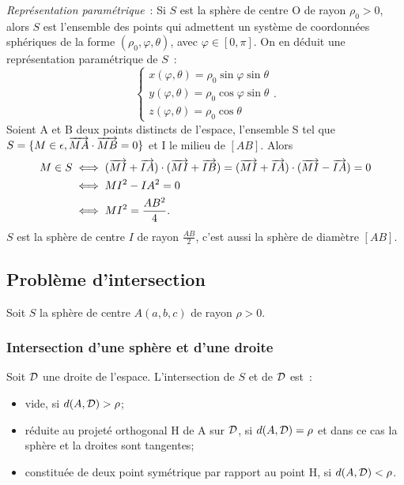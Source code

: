 \emph{Représentation paramétrique}~: Si \(S\) est la sphère de centre O de rayon \(\rho_0>0\), alors \(S\) est l'ensemble des points qui admettent un système de coordonnées sphériques de la forme \((\rho_0,\varphi,\theta)\), avec \(\varphi\in[0,\pi]\).
On en déduit une représentation paramétrique de \(S\)~:
\begin{equation}
  \begin{cases}
    x(\varphi,\theta)=\rho_0\sin\varphi\sin\theta\\
    y(\varphi,\theta)=\rho_0\cos\varphi\sin\theta\\
    z(\varphi,\theta)=\rho_0\cos\theta
  \end{cases}.
\end{equation}
Soient A et B deux points distincts de l'espace, l'ensemble S tel que \(S=\{M \in \epsilon, \overrightarrow{MA}\cdot\overrightarrow{MB}=0\}\) et I le milieu de \([AB]\). Alors
\begin{align}
  M \in S & \iff (\overrightarrow{MI}+\overrightarrow{IA})\cdot(\overrightarrow{MI}+\overrightarrow{IB})= (\overrightarrow{MI}+\overrightarrow{IA})\cdot(\overrightarrow{MI}-\overrightarrow{IA})=0\\
  &\iff MI^2-IA^2=0\\
  &\iff MI^2=\frac{AB^2}{4}.
\end{align}
\(S\) est la sphère de centre \(I\) de rayon \(\frac{AB}{2}\), c'est aussi la sphère de diamètre \([AB]\).

\subsection{Problème d'intersection}
Soit \(S\) la sphère de centre \(A(a,b,c)\) de rayon \(\rho>0\).

\subsubsection{Intersection d'une sphère et d'une droite}

\begin{prop}
  Soit \(\mathcal{D}\) une droite de l'espace. L'intersection de \(S\) et de \(\mathcal{D}\) est~:
  \begin{itemize}
  \item vide, si \(d(A,\mathcal{D})>\rho\);
  \item réduite au projeté orthogonal H de A sur \(\mathcal{D}\), si \(d(A,\mathcal{D})=\rho\) et dans ce cas la sphère et la droites sont tangentes;
  \item constituée de deux point symétrique par rapport au point H, si \(d(A,\mathcal{D})<\rho\).
  \end{itemize}
\end{prop}

